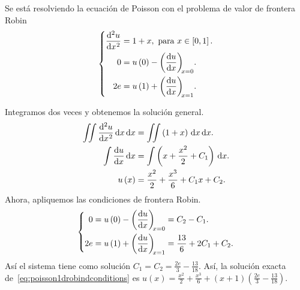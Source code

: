 \begin{solution}
    Se está resolviendo la ecuación de Poisson con el
    problema de valor de frontera Robin
    \begin{equation*}
        \left\{
        \begin{aligned}
            \diff[2]{u}{x}
             & =1+x,
            \text{ para }x\in\left[0,1\right].     \\
            0
             & = u\left(0\right)-\diff{u}{x}[x=0]. \\
            2e
             & =u\left(1\right)+\diff{u}{x}[x=1].  \\
        \end{aligned}
        \right.
    \end{equation*}

    Integramos dos veces y obtenemos la solución general.
    \begin{align*}
        \iint
        \diff[2]{u}{x}
        \dl x
        \dl x           & =
        \iint
        \left(1+x\right)
        \dl x
        \dl x.              \\
        \int
        \diff{u}{x}
        \dl x           & =
        \int
        \left(x+\frac{x^{2}}{2}+C_{1}\right)
        \dl x.              \\
        u\left(x\right) & =
        \frac{x^{2}}{2}+\frac{x^{3}}{6}+C_{1}x+C_{2}.
    \end{align*}
    Ahora, apliquemos las condiciones de frontera Robin.
    \begin{equation}
        \left\{
        \begin{aligned}
            0
             & =
            u\left(0\right)-
            \diff{u}{x}[x=0]=
            C_{2}-C_{1}. \\
            2e
             & =
            u\left(1\right)+
            \diff{u}{x}[x=1]=
            \frac{13}{6}+2C_{1}+C_{2}.
        \end{aligned}
        \right.
    \end{equation}
    Así el sistema tiene como solución
    $C_{1}=C_{2}=\frac{2e}{3}-\frac{13}{18}$.
    Así, la solución exacta
    de~\eqref{eq:poisson1drobindconditions} es
    \begin{math}
        u\left(x\right)=
        \frac{x^{2}}{2}+\frac{x^{3}}{6}+
        \left(x+1\right)\left(\frac{2e}{3}-\frac{13}{18}\right)
    \end{math}.

\end{solution}
